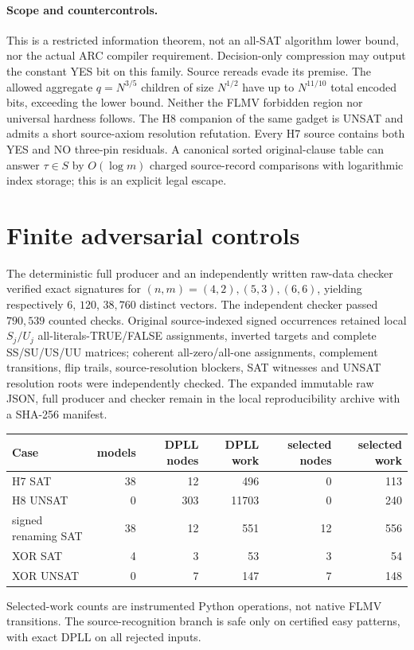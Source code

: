 \documentclass[11pt]{article}
\begin{document}
\paragraph{Scope and countercontrols.}
This is a restricted information theorem, not an all-SAT algorithm
lower bound, nor the actual ARC compiler requirement.
Decision-only compression may output the constant YES bit on this
family. Source rereads evade its premise. The allowed aggregate
$q=N^{3/5}$ children of size $N^{1/2}$ have up to $N^{11/10}$
total encoded bits, exceeding the lower bound. Neither the
FLMV forbidden region nor universal hardness follows. The H8
companion of the same gadget is UNSAT and admits a short source-axiom
resolution refutation. Every H7 source contains both YES and NO
three-pin residuals. A canonical sorted original-clause table can
answer $\tau\in S$ by $O(\log m)$ charged source-record comparisons
with logarithmic index storage; this is an explicit legal escape.
\section*{Finite adversarial controls}
The deterministic full producer and an independently written raw-data
checker verified exact signatures for $(n,m)=(4,2),(5,3),(6,6)$,
yielding respectively $6$, $120$, $38,760$ distinct vectors.
The independent checker passed $790,539$ counted checks.
Original source-indexed signed occurrences retained local $S_j/U_j$
all-literals-TRUE/FALSE assignments, inverted targets and complete
SS/SU/US/UU matrices; coherent all-zero/all-one assignments,
complement transitions, flip trails, source-resolution blockers,
SAT witnesses and UNSAT resolution roots were independently checked.
The expanded immutable raw JSON, full producer and checker
remain in the local reproducibility archive with a SHA-256 manifest.
\begin{center}\small\begin{tabular}{lrrrrr}\toprule
Case & models & DPLL nodes & DPLL work & selected nodes & selected work\\\midrule
H7 SAT &38&12&496&0&113\\
H8 UNSAT &0&303&11703&0&240\\
signed renaming SAT &38&12&551&12&556\\
XOR SAT &4&3&53&3&54\\
XOR UNSAT &0&7&147&7&148\\\bottomrule
\end{tabular}\end{center}
Selected-work counts are instrumented Python operations, not native
FLMV transitions. The source-recognition branch is safe only on
certified easy patterns, with exact DPLL on all rejected inputs.
\end{document}
